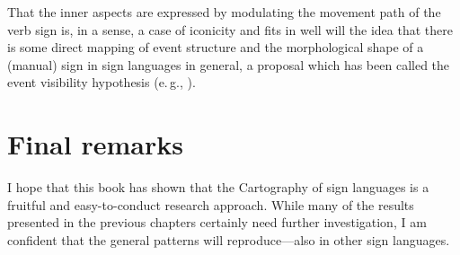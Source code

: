 That the inner aspects are expressed by modulating the movement path of the verb sign is, in a sense, a case of iconicity and fits in well will the idea that there is some direct mapping of event structure and the morphological shape of a (manual) sign in sign languages in general, a proposal which has been called the event visibility hypothesis (e.\,g., \citealt{wilbur2004event, wilbur2008complex, grose2007events}).





\section{Final remarks}
I hope that this book has shown that the Cartography of sign languages is a fruitful and easy-to-conduct research approach. While many of the results presented in the previous chapters certainly need further investigation, I am confident that the general patterns will reproduce---also in other sign languages. 



